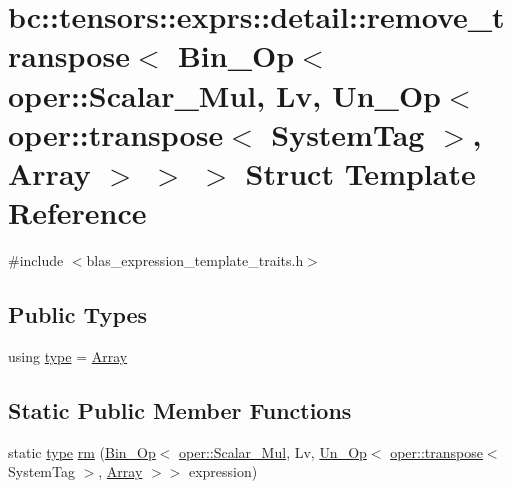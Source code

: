 \hypertarget{structbc_1_1tensors_1_1exprs_1_1detail_1_1remove__transpose_3_01Bin__Op_3_01oper_1_1Scalar__Mul_66d4ba5d587ca66fdce7c61c9a3f28e3}{}\section{bc\+:\+:tensors\+:\+:exprs\+:\+:detail\+:\+:remove\+\_\+transpose$<$ Bin\+\_\+\+Op$<$ oper\+:\+:Scalar\+\_\+\+Mul, Lv, Un\+\_\+\+Op$<$ oper\+:\+:transpose$<$ System\+Tag $>$, Array $>$ $>$ $>$ Struct Template Reference}
\label{structbc_1_1tensors_1_1exprs_1_1detail_1_1remove__transpose_3_01Bin__Op_3_01oper_1_1Scalar__Mul_66d4ba5d587ca66fdce7c61c9a3f28e3}


{\ttfamily \#include $<$blas\+\_\+expression\+\_\+template\+\_\+traits.\+h$>$}

\subsection*{Public Types}
\begin{DoxyCompactItemize}
\item 
using \hyperlink{structbc_1_1tensors_1_1exprs_1_1detail_1_1remove__transpose_3_01Bin__Op_3_01oper_1_1Scalar__Mul_66d4ba5d587ca66fdce7c61c9a3f28e3_a7fed62515e6f0c29ccb40182677a96c7}{type} = \hyperlink{structbc_1_1tensors_1_1exprs_1_1Array}{Array}
\end{DoxyCompactItemize}
\subsection*{Static Public Member Functions}
\begin{DoxyCompactItemize}
\item 
static \hyperlink{structbc_1_1tensors_1_1exprs_1_1detail_1_1remove__transpose_3_01Bin__Op_3_01oper_1_1Scalar__Mul_66d4ba5d587ca66fdce7c61c9a3f28e3_a7fed62515e6f0c29ccb40182677a96c7}{type} \hyperlink{structbc_1_1tensors_1_1exprs_1_1detail_1_1remove__transpose_3_01Bin__Op_3_01oper_1_1Scalar__Mul_66d4ba5d587ca66fdce7c61c9a3f28e3_a3da4bd97ac2349ef2f88c949594846fc}{rm} (\hyperlink{structbc_1_1tensors_1_1exprs_1_1Bin__Op}{Bin\+\_\+\+Op}$<$ \hyperlink{structbc_1_1oper_1_1Scalar__Mul}{oper\+::\+Scalar\+\_\+\+Mul}, Lv, \hyperlink{structbc_1_1tensors_1_1exprs_1_1Un__Op}{Un\+\_\+\+Op}$<$ \hyperlink{structbc_1_1oper_1_1transpose}{oper\+::transpose}$<$ System\+Tag $>$, \hyperlink{structbc_1_1tensors_1_1exprs_1_1Array}{Array} $>$$>$ expression)
\end{DoxyCompactItemize}


